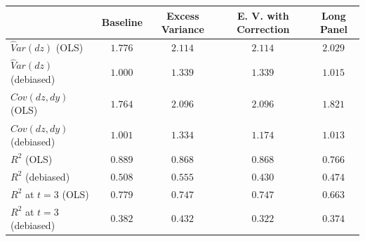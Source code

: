 \begin{tabular}{l*{4}{c}}
\hline\hline
& Baseline & Excess Variance & E. V. with Correction & Long Panel \\
\hline
\addlinespace$\hat Var(dz)$ (OLS) & $1.776^{}$ & $2.114^{}$ & $2.114^{}$ & $2.029^{}$ \\
$\hat Var(dz)$ (debiased) & $1.000^{}$ & $1.339^{}$ & $1.339^{}$ & $1.015^{}$ \\
\addlinespace$\hat Cov(dz, dy)$ (OLS) & $1.764^{}$ & $2.096^{}$ & $2.096^{}$ & $1.821^{}$ \\
$\hat Cov(dz,dy)$ (debiased) & $1.001^{}$ & $1.334^{}$ & $1.174^{}$ & $1.013^{}$ \\
\addlinespace $ R^2$ (OLS) & $0.889^{}$ & $0.868^{}$ & $0.868^{}$ & $0.766^{}$ \\
$ R^2$ (debiased) & $0.508^{}$ & $0.555^{}$ & $0.430^{}$ & $0.474^{}$ \\
\addlinespace $ R^2$ at $ t=3$ (OLS) & $0.779^{}$ & $0.747^{}$ & $0.747^{}$ & $0.663^{}$ \\
$ R^2$ at $ t=3$ (debiased) & $0.382^{}$ & $0.432^{}$ & $0.322^{}$ & $0.374^{}$ \\
\hline\hline
\end{tabular}
